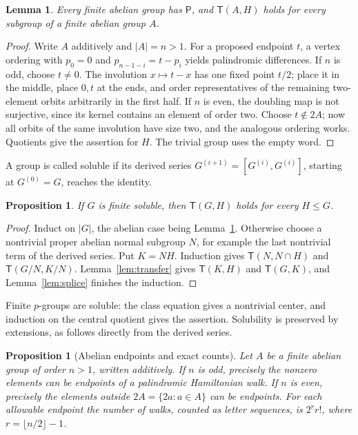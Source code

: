 \documentclass[11pt]{article}
\newtheorem{lemma}[theorem]{Lemma}
\newtheorem{proposition}[theorem]{Proposition}
\theoremstyle{definition}
\newcommand{\Pp}{\mathsf P}
\newcommand{\Tt}{\mathsf T}
\begin{document}
\begin{lemma}\label{lem:abelian}
Every finite abelian group has $\Pp$, and $\Tt(A,H)$ holds for every subgroup of a finite abelian group $A$.
\end{lemma}
\begin{proof}
Write $A$ additively and $|A|=n>1$. For a proposed endpoint $t$, a vertex ordering with $p_0=0$ and $p_{n-1-i}=t-p_i$ yields palindromic differences. If $n$ is odd, choose $t\ne0$. The involution $x\mapsto t-x$ has one fixed point $t/2$; place it in the middle, place $0,t$ at the ends, and order representatives of the remaining two-element orbits arbitrarily in the first half. If $n$ is even, the doubling map is not surjective, since its kernel contains an element of order two. Choose $t\notin2A$; now all orbits of the same involution have size two, and the analogous ordering works. Quotients give the assertion for $H$. The trivial group uses the empty word.
\end{proof}
A group is called soluble if its derived series $G^{(i+1)}=[G^{(i)},G^{(i)}]$, starting at $G^{(0)}=G$, reaches the identity. 
\begin{proposition}\label{prop:solvable}
If $G$ is finite soluble, then $\Tt(G,H)$ holds for every $H\le G$.
\end{proposition}
\begin{proof}
Induct on $|G|$, the abelian case being Lemma~\ref{lem:abelian}. Otherwise choose a nontrivial proper abelian normal subgroup $N$, for example the last nontrivial term of the derived series. Put $K=NH$. Induction gives $\Tt(N,N\cap H)$ and $\Tt(G/N,K/N)$. Lemma~\ref{lem:transfer} gives $\Tt(K,H)$ and $\Tt(G,K)$, and Lemma~\ref{lem:splice} finishes the induction.
\end{proof}
Finite $p$-groups are soluble: the class equation gives a nontrivial center, and induction on the central quotient gives the assertion. Solubility is preserved by extensions, as follows directly from the derived series. 
\begin{proposition}[Abelian endpoints and exact counts]\label{prop:abeliancount}
Let $A$ be a finite abelian group of order $n>1$, written additively. If $n$ is odd, precisely the nonzero elements can be endpoints of a palindromic Hamiltonian walk. If $n$ is even, precisely the elements outside $2A=\{2a:a\in A\}$ can be endpoints. For each allowable endpoint the number of walks, counted as letter sequences, is $2^r r!$, where $r=\lfloor n/2\rfloor-1$.
\end{proposition}
\end{document}
